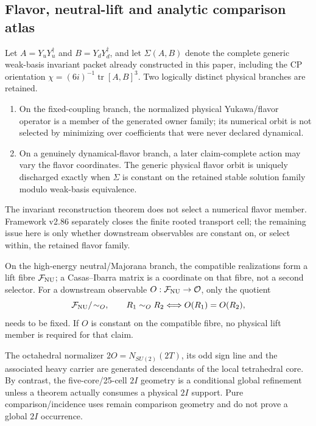 \documentclass[11pt,a4paper]{article}
\begin{document}
\subsection{Flavor, neutral-lift and analytic comparison atlas}
\label{p6:sec:v236-flavor-lift-atlas}
\begin{proposition}
\label{p6:prop:v236-flavor-branches}
Let \(A=Y_uY_u^\dagger\) and \(B=Y_dY_d^\dagger\), and let
\(\Sigma(A,B)\) denote the complete generic weak-basis invariant packet
already constructed in this paper, including the CP orientation
\(\chi=(6i)^{-1}\operatorname{tr}[A,B]^3\).  Two logically distinct physical
branches are retained.
\begin{enumerate}[label=(\roman*),leftmargin=2.2em]
\item On the fixed-coupling branch, the normalized physical Yukawa/flavor
operator is a member of the generated owner family; its numerical orbit is not
selected by minimizing over coefficients that were never declared dynamical.
\item On a genuinely dynamical-flavor branch, a later claim-complete action may
vary the flavor coordinates.  The generic physical flavor orbit is uniquely
discharged exactly when \(\Sigma\) is constant on the retained stable solution
family modulo weak-basis equivalence.
\end{enumerate}
The invariant reconstruction theorem does not select a numerical flavor member.  Framework v2.86 separately closes the finite rooted transport cell; the remaining issue here is only whether downstream observables are constant on, or select within, the retained flavor family.
\end{proposition}

\begin{proposition}
\label{p6:prop:v236-neutral-lift-quotient}
On the high-energy neutral/Majorana branch, the compatible realizations form a
lift fibre \(\mathcal F_{\rm NU}\); a Casas--Ibarra matrix is a coordinate on
that fibre, not a second selector.  For a downstream observable
\(O:\mathcal F_{\rm NU}\to\mathcal O\), only the quotient
\[
 \mathcal F_{\rm NU}/\!\sim_O,
 \qquad R_1\sim_OR_2\Longleftrightarrow O(R_1)=O(R_2),
\]
needs to be fixed.  If \(O\) is constant on the compatible fibre, no physical
lift member is required for that claim.
\end{proposition}

\begin{remark}
\label{p6:rem:v236-o-i-typing}
The octahedral normalizer \(2O=N_{SU(2)}(2T)\), its odd sign line and the
associated heavy carrier are generated descendants of the local tetrahedral
core.  By contrast, the five-core/25-cell \(2I\) geometry is a conditional
global refinement unless a theorem actually consumes a physical \(2I\)
support.  Pure comparison/incidence uses remain comparison geometry and do not
prove a global \(2I\) occurrence.
\end{remark}
\end{document}

